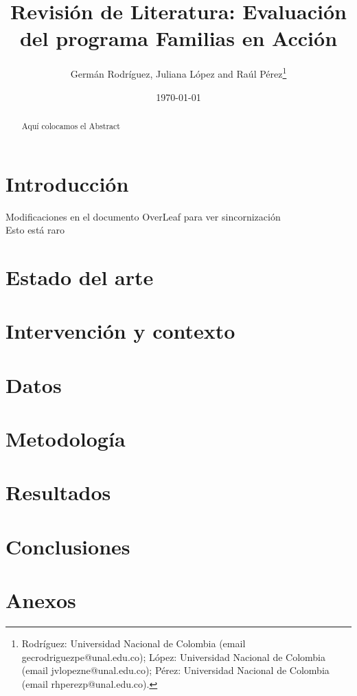 \documentclass[AER]{AEA}
\begin{document}
\title{Revisión de Literatura: Evaluación del programa Familias en Acción}
\author{Germán Rodríguez, Juliana López and Raúl Pérez\thanks{Rodríguez: Universidad Nacional de Colombia (email gecrodriguezpe@unal.edu.co); López: Universidad Nacional de Colombia (email jvlopezne@unal.edu.co); Pérez: Universidad Nacional de Colombia (email rhperezp@unal.edu.co).}}
\date{\today}

\begin{abstract}
Aquí colocamos el Abstract
\end{abstract}

\maketitle

\section{Introducción}

Modificaciones en el documento OverLeaf para ver sincornización \\
Esto está raro


\section{Estado del arte}

\section{Intervención y contexto}

\section{Datos}

\section{Metodología}

\section{Resultados}

\section{Conclusiones}

\section{Anexos}

\newpage


\end{document}
